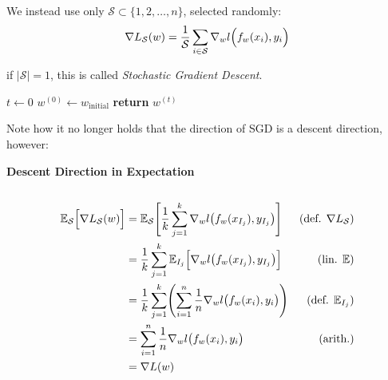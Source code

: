 We instead use only $\mathcal S \subset \{1,2,\ldots,n\}$, selected randomly:
$$
    \nabla L_\mathcal{S}(w) = \frac{1}{\mathcal{S}}\sum_{i\in\mathcal S} \nabla_w l\Bigl(f_w(x_i), y_i\Bigr)
$$

{\footnotesize
    \remark if $|\mathcal{S}|=1$, this is called \textit{Stochastic Gradient Descent}.
}

\begin{algorithm}
    \caption{Stochastic Minibatch Gradient Descent}
    $t \gets 0$ \;
    $w^{(0)} \gets w_\text{initial}$ \;
    \textbf{return} $w^{(t)}$
\end{algorithm}

Note how it no longer holds that the direction of SGD is a descent direction, however:

\lemma \textbf{Descent Direction in Expectation}\\
\\
\begin{align*}
    \mathbb{E}_\mathcal{S}\Bigl[ \nabla L_\mathcal{S}(w) \Bigr] &= \mathbb{E}_\mathcal{S} \Biggl[ \frac{1}{k}\sum_{j=1}^{k}\nabla_w l\bigl( f_w(x_{I_j}), y_{I_j} \bigr) \Biggr]  & (\text{def. } \nabla L_\mathcal{S})     \\
                                                        &= \frac{1}{k}\sum_{j=1}^{k} \mathbb{E}_{I_j}\Bigl[ \nabla_w l\bigl( f_w(x_{I_j}), y_{I_j} \bigr) \Bigr]          & (\text{lin. } \mathbb{E})                       \\
                                                        &= \frac{1}{k}\sum_{j=1}^{k} \Biggl( \sum_{i=1}^{n}\frac{1}{n}\nabla_w l\bigl(f_w(x_i), y_i\bigr) \Biggr) & (\text{def. } \mathbb{E}_{I_j})                 \\
                                                        &= \sum_{i=1}^{n}\frac{1}{n}\nabla_w l\bigl(f_w(x_i), y_i\bigr)                                           & (\text{arith.})                          \\
                                                        &= \nabla L(w)  
\end{align*}

